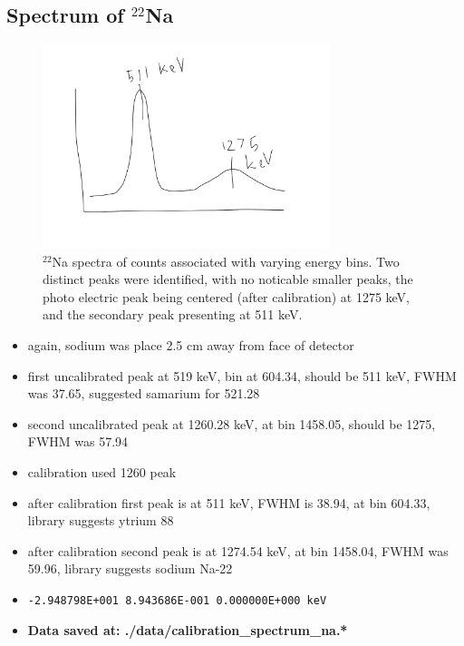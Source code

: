 \documentclass[a4paper]{article}
\begin{document}
\subsection{Spectrum of $^{22}$Na}
\begin{figure}[H]
    \centering
    \includegraphics[width=0.75\textwidth]{figures/sodium_22_counts.pdf}
    \caption{$^{22}$Na spectra of counts associated with varying energy bins. Two distinct peaks were identified, with no noticable smaller peaks, the photo electric peak being centered (after calibration) at 1275 keV, and the secondary peak presenting at 511 keV.}
\end{figure}
\begin{itemize}
    \item again, sodium was place 2.5 cm away from face of detector
    \item first uncalibrated peak at 519 keV, bin at 604.34, should be 511 keV, FWHM was 37.65, suggested samarium for 521.28
    \item second uncalibrated peak at 1260.28 keV, at bin 1458.05, should be 1275, FWHM was 57.94
    \item calibration used 1260 peak
    \item after calibration first peak is at 511 keV, FWHM is 38.94, at bin 604.33, library suggests ytrium 88
    \item after calibration second peak is at 1274.54 keV, at bin 1458.04, FWHM was 59.96, library suggests sodium Na-22
    \item \verb|-2.948798E+001 8.943686E-001 0.000000E+000 keV|
    \item \textbf{Data saved at: ./data/calibration\_spectrum\_na.*}
\end{itemize}
\end{document}
